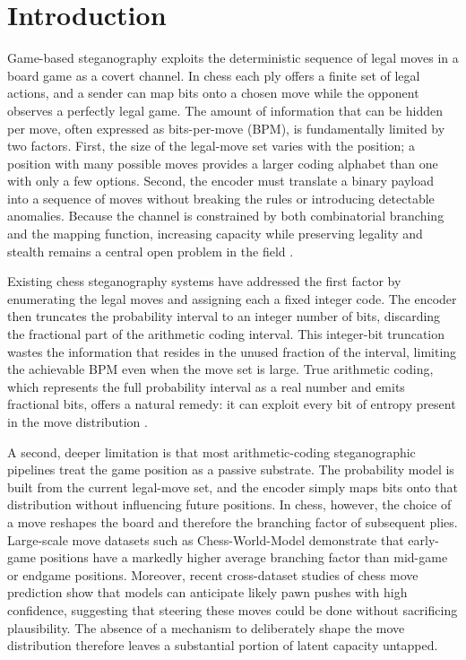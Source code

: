 \documentclass[journal]{IEEEtran}
\begin{document}
\section{Introduction}\label{sec:introduction}
Game-based steganography exploits the deterministic sequence of legal moves in a board game as a covert channel. In chess each ply offers a finite set of legal actions, and a sender can map bits onto a chosen move while the opponent observes a perfectly legal game. The amount of information that can be hidden per move, often expressed as bits-per-move (BPM), is fundamentally limited by two factors. First, the size of the legal-move set varies with the position; a position with many possible moves provides a larger coding alphabet than one with only a few options. Second, the encoder must translate a binary payload into a sequence of moves without breaking the rules or introducing detectable anomalies. Because the channel is constrained by both combinatorial branching and the mapping function, increasing capacity while preserving legality and stealth remains a central open problem in the field \cite{shen2020nearimpercepti, nasution2018imagesteganogr, baraskar2018truecolor}.

Existing chess steganography systems have addressed the first factor by enumerating the legal moves and assigning each a fixed integer code. The encoder then truncates the probability interval to an integer number of bits, discarding the fractional part of the arithmetic coding interval. This integer-bit truncation wastes the information that resides in the unused fraction of the interval, limiting the achievable BPM even when the move set is large. True arithmetic coding, which represents the full probability interval as a real number and emits fractional bits, offers a natural remedy: it can exploit every bit of entropy present in the move distribution \cite{walker2026chessworld, durge2026crossdataset}.

A second, deeper limitation is that most arithmetic-coding steganographic pipelines treat the game position as a passive substrate. The probability model is built from the current legal-move set, and the encoder simply maps bits onto that distribution without influencing future positions. In chess, however, the choice of a move reshapes the board and therefore the branching factor of subsequent plies. Large-scale move datasets such as Chess-World-Model demonstrate that early-game positions have a markedly higher average branching factor than mid-game or endgame positions. Moreover, recent cross-dataset studies of chess move prediction show that models can anticipate likely pawn pushes with high confidence, suggesting that steering these moves could be done without sacrificing plausibility. The absence of a mechanism to deliberately shape the move distribution therefore leaves a substantial portion of latent capacity untapped.
\end{document}
